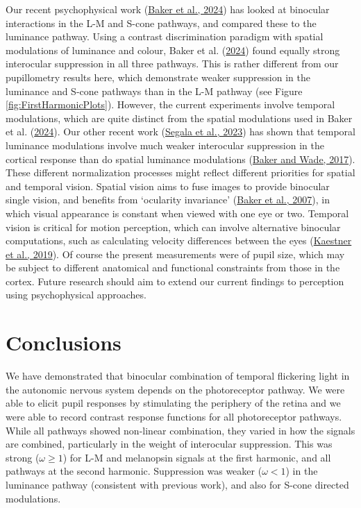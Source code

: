 \documentclass[
]{article}
\begin{document}
Our recent psychophysical work (\protect\hyperlink{ref-Baker2024}{Baker et al., 2024}) has looked at binocular interactions in the L-M and S-cone pathways, and compared these to the luminance pathway. Using a contrast discrimination paradigm with spatial modulations of luminance and colour, Baker et al. (\protect\hyperlink{ref-Baker2024}{2024}) found equally strong interocular suppression in all three pathways. This is rather different from our pupillometry results here, which demonstrate weaker suppression in the luminance and S-cone pathways than in the L-M pathway (see Figure \ref{fig:FirstHarmonicPlots}). However, the current experiments involve temporal modulations, which are quite distinct from the spatial modulations used in Baker et al. (\protect\hyperlink{ref-Baker2024}{2024}). Our other recent work (\protect\hyperlink{ref-Segala2023}{Segala et al., 2023}) has shown that temporal luminance modulations involve much weaker interocular suppression in the cortical response than do spatial luminance modulations (\protect\hyperlink{ref-Baker2017}{Baker and Wade, 2017}). These different normalization processes might reflect different priorities for spatial and temporal vision. Spatial vision aims to fuse images to provide binocular single vision, and benefits from `ocularity invariance' (\protect\hyperlink{ref-Baker2007}{Baker et al., 2007}), in which visual appearance is constant when viewed with one eye or two. Temporal vision is critical for motion perception, which can involve alternative binocular computations, such as calculating velocity differences between the eyes (\protect\hyperlink{ref-Kaestner2019}{Kaestner et al., 2019}). Of course the present measurements were of pupil size, which may be subject to different anatomical and functional constraints from those in the cortex. Future research should aim to extend our current findings to perception using psychophysical approaches.

\hypertarget{conclusions}{%
\section{Conclusions}\label{conclusions}}

We have demonstrated that binocular combination of temporal flickering light in the autonomic nervous system depends on the photoreceptor pathway. We were able to elicit pupil responses by stimulating the periphery of the retina and we were able to record contrast response functions for all photoreceptor pathways. While all pathways showed non-linear combination, they varied in how the signals are combined, particularly in the weight of interocular suppression. This was strong (\(\omega \ge 1\)) for L-M and melanopsin signals at the first harmonic, and all pathways at the second harmonic. Suppression was weaker (\(\omega < 1\)) in the luminance pathway (consistent with previous work), and also for S-cone directed modulations.
\end{document}
